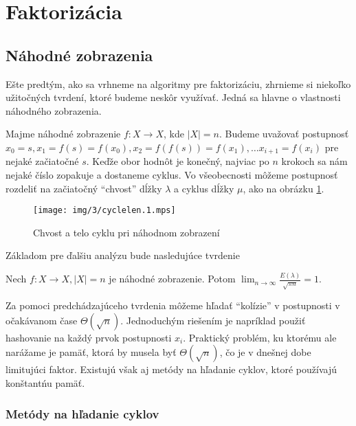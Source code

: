\section{Faktorizácia}

\subsection{Náhodné zobrazenia}
Ešte predtým, ako sa vrhneme na algoritmy pre faktorizáciu, zhrnieme
si niekoľko užitočných tvrdení, ktoré budeme neskôr využívať. Jedná sa
hlavne o vlastnosti náhodného zobrazenia.

Majme náhodné zobrazenie $f:X \rightarrow X$, kde $|X| = n$.
Budeme uvažovať postupnosť $x_0 = s, x_1=f(s)=f(x_0), x_2 =
f(f(s))=f(x_1), \dots x_{i+1} = f(x_{i})$ pre nejaké začiatočné $s$.
Keďže obor hodnôt je konečný, najviac po $n$ krokoch sa nám nejaké
číslo zopakuje a dostaneme cyklus. Vo všeobecnosti môžeme postupnosť
rozdeliť na začiatočný ``chvost'' dĺžky $\lambda$ a cyklus dĺžky
$\mu$, ako na obrázku \ref{fig:cyclelen}.

\begin{figure}[H]
    \caption{Chvost a telo cyklu pri náhodnom zobrazení}
    \label{fig:cyclelen}
    \centering
    \texttt{[image: img/3/cyclelen.1.mps]}
\end{figure}

Základom pre ďalšiu analýzu bude nasledujúce tvrdenie
\begin{lema}
    Nech $f:X\rightarrow X, |X|=n$ je náhodné zobrazenie.
    Potom $\lim_{n\rightarrow \infty} \frac{E(\lambda)}{\sqrt{\pi n}}
    = 1$. \fixme{}
\end{lema}
\begin{dokaz}
\end{dokaz}

Za pomoci predchádzajúceho tvrdenia môžeme hľadať ``kolízie'' v
postupnosti v očakávanom čase $\Theta(\sqrt{n})$.
Jednoduchým riešením je napríklad použiť hashovanie na každý prvok
postupnosti $x_i$. Praktický problém, ku ktorému ale narážame je
pamäť, ktorá by musela byť $\Theta(\sqrt{n})$, čo je v dnešnej dobe
limitujúci faktor. Existujú však aj metódy na hľadanie cyklov,
ktoré používajú konštantńu pamäť.

\subsubsection{Metódy na hľadanie cyklov}

